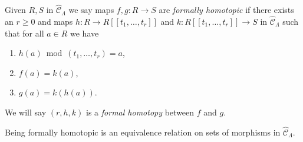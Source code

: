 \noindent
Given $R, S$ in $\widehat{\mathcal{C}}_\Lambda$ we say maps
$f, g : R \to S$ are {\it formally homotopic} if there exists an
$r \geq 0$ and maps $h : R \to R[[t_1, \ldots, t_r]]$ and
$k : R[[t_1, \ldots, t_r]] \to S$ in $\widehat{\mathcal{C}}_\Lambda$
such that for all $a \in R$ we have
\begin{enumerate}
\item $h(a) \bmod (t_1, \ldots, t_r) = a$,
\item $f(a) = k(a)$,
\item $g(a) = k(h(a))$.
\end{enumerate}
We will say $(r, h, k)$ is a {\it formal homotopy} between $f$ and $g$.

\begin{lemma}
\label{lemma-homotopy}
Being formally homotopic is an equivalence relation on
sets of morphisms in $\widehat{\mathcal{C}}_\Lambda$.
\end{lemma}

